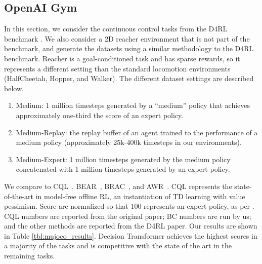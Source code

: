 \subsection{OpenAI Gym} \label{sec:gym_results}

In this section, we consider the continuous control tasks from the D4RL benchmark \citep{fu2020d4rl}.
We also consider a 2D reacher environment that is not part of the benchmark, and generate the datasets using a similar methodology to the D4RL benchmark.
Reacher is a goal-conditioned task and has sparse rewards, so it represents a different setting than the standard locomotion environments (HalfCheetah, Hopper, and Walker).
The different dataset settings are described below.
\begin{enumerate}[leftmargin=*]
    \item Medium: 1 million timesteps generated by a ``medium'' policy that achieves approximately one-third the score of an expert policy.
    \item Medium-Replay: the replay buffer of an agent trained to the performance of a medium policy (approximately 25k-400k timesteps in our environments).
    \item Medium-Expert: 1 million timesteps generated by the medium policy concatenated with 1 million timesteps generated by an expert policy.
\end{enumerate}

We compare to CQL~\citep{kumar2020conservative}, BEAR~\citep{kumar2019bear}, BRAC~\citep{wu2019brac}, and AWR~\citep{peng2019awr}.
CQL represents the state-of-the-art in model-free offline RL, an instantiation of TD learning with value pessimism.
Score are normalized so that 100 represents an expert policy, as per \citet{fu2020d4rl}.
CQL numbers are reported from the original paper; BC numbers are run by us; and the other methods are reported from the D4RL paper.
Our results are shown in Table \ref{tbl:mujoco_results}.
Decision Transformer achieves the highest scores in a majority of the tasks and is competitive with the state of the art in the remaining tasks.

